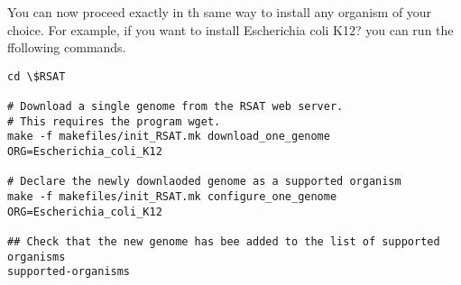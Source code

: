 You can now proceed exactly in th same way to install any organism of
your choice. For example, if you want to install Escherichia coli K12?
you can run the ffollowing commands.

\begin{small}
\begin{verbatim}
cd \$RSAT

# Download a single genome from the RSAT web server. 
# This requires the program wget.
make -f makefiles/init_RSAT.mk download_one_genome ORG=Escherichia_coli_K12

# Declare the newly downlaoded genome as a supported organism
make -f makefiles/init_RSAT.mk configure_one_genome ORG=Escherichia_coli_K12

## Check that the new genome has bee added to the list of supported organisms
supported-organisms


\end{verbatim}
\end{small}









